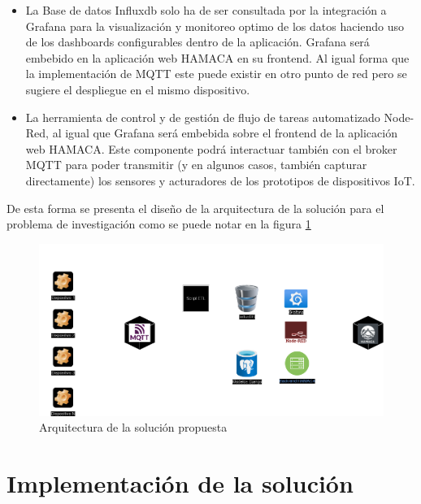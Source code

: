 \begin{itemize}
\item La Base de datos Influxdb solo ha de ser consultada por la integración a Grafana para la visualización y monitoreo optimo de los datos haciendo uso de los dashboards configurables dentro de la aplicación. Grafana será embebido en la aplicación web HAMACA en su frontend. Al igual forma que la implementación de MQTT este puede existir en otro punto de red pero se sugiere el despliegue en el mismo dispositivo. 

\item La herramienta de control y de gestión de flujo de tareas automatizado Node-Red, al igual que Grafana será embebida sobre el frontend de la aplicación web HAMACA. Este componente podrá interactuar también con el broker MQTT para poder transmitir (y en algunos casos, también capturar directamente) los sensores y acturadores de los prototipos de dispositivos IoT.

\end{itemize}
De esta forma se presenta el diseño de la arquitectura de la solución para el problema de investigación como se puede notar en la figura \ref{fig:arquitectura_hamaca}
\begin{figure}[!htb]
\centering
\includegraphics[scale=0.4]{./Figuras/arquitectura_hamaca.png}
\caption{Arquitectura de la solución propuesta}
\label{fig:arquitectura_hamaca}
\vspace*{-10pt}
\end{figure}

\section{Implementación de la solución}


